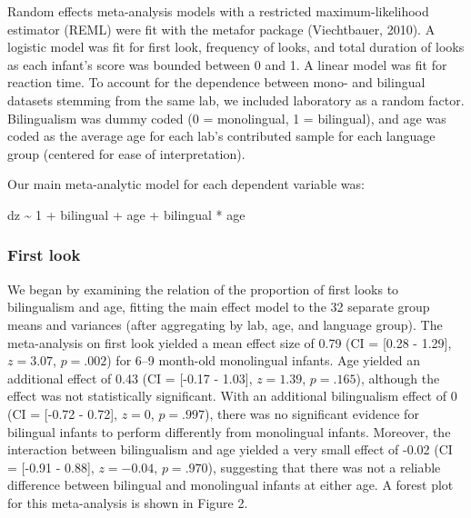 \documentclass[,man,floatsintext]{apa6}
\begin{document}
Random effects meta-analysis models with a restricted maximum-likelihood estimator (REML) were fit with the metafor package (Viechtbauer, 2010). A logistic model was fit for first look, frequency of looks, and total duration of looks as each infant's score was bounded between 0 and 1. A linear model was fit for reaction time. To account for the dependence between mono- and bilingual datasets stemming from the same lab, we included laboratory as a random factor. Bilingualism was dummy coded (0 = monolingual, 1 = bilingual), and age was coded as the average age for each lab's contributed sample for each language group (centered for ease of interpretation).

Our main meta-analytic model for each dependent variable was:

dz \textasciitilde{} 1 + bilingual + age + bilingual * age

\hypertarget{first-look-1}{%
\subsubsection{First look}\label{first-look-1}}

We began by examining the relation of the proportion of first looks to bilingualism and age, fitting the main effect model to the 32 separate group means and variances (after aggregating by lab, age, and language group). The meta-analysis on first look yielded a mean effect size of 0.79 (CI = {[}0.28 - 1.29{]}, \(z = 3.07\), \(p = .002\)) for 6--9 month-old monolingual infants. Age yielded an additional effect of 0.43 (CI = {[}-0.17 - 1.03{]}, \(z = 1.39\), \(p = .165\)), although the effect was not statistically significant. With an additional bilingualism effect of 0 (CI = {[}-0.72 - 0.72{]}, \(z = 0\), \(p = .997\)), there was no significant evidence for bilingual infants to perform differently from monolingual infants. Moreover, the interaction between bilingualism and age yielded a very small effect of -0.02 (CI = {[}-0.91 - 0.88{]}, \(z = -0.04\), \(p = .970\)), suggesting that there was not a reliable difference between bilingual and monolingual infants at either age. A forest plot for this meta-analysis is shown in Figure 2.
\end{document}
